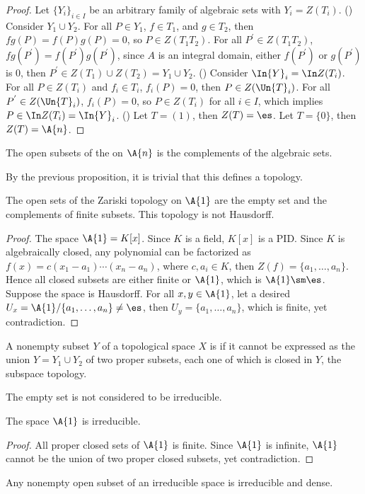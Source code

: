 \documentclass[10pt]{article}
\begin{document}
\begin{proof}
    Let ${\{{Y}_{i}\}}_{i\in I}$ be an arbitrary family of algebraic sets with ${Y}_{i}=Z({T}_{i})$. 
    () Consider ${Y}_{1}\cup{Y}_{2}$. For all $P\in{Y}_{1}$, $f\in{T}_{1}$, and $g\in{T}_{2}$, then $fg(P)=f(P)g(P)=0$, so $P\in Z({T}_{1}{T}_{2})$. For all ${P}^{'}\in Z({T}_{1}{T}_{2})$, $fg({P}^{'})=f({P}^{'})g({P}^{'})$, since $A$ is an integral domain, either $f({P}^{'})$ or $g({P}^{'})$ is 0, then ${P}^{'}\in Z({T}_{1})\cup Z({T}_{2})={Y}_{1}\cup{Y}_{2}$. () Consider $\In{Y}_{i}=\In Z({T}_{i})$. For all $P\in Z({T}_{i})$ and ${f}_{i}\in{T}_{i}$, ${f}_{i}(P)=0$, then $P\in Z(\Un{T}_{i})$. For all ${P}^{'}\in Z(\Un{T}_{i})$, ${f}_{i}(P)=0$, so $P\in Z({T}_{i})$ for all $i\in I$, which implies $P\in\In Z({T}_{i})=\In{Y}_{i}$. () Let $T=(1)$, then $Z(T)=\es$. Let $T=\{0\}$, then $Z(T)=\A{n}$.
\end{proof}
\begin{definition}
    The open subsets of the  on $\A{n}$ is the complements of the algebraic sets.
\end{definition}
\par
By the previous proposition, it is trivial that this defines a topology.
\begin{example}
    The open sets of the Zariski topology on $\A{1}$ are the empty set and the complements of finite subsets. This topology is not Hausdorff.
\end{example}
\begin{proof}
    The space $\A{1}=K[x]$. Since $K$ is a field, $K[x]$ is a PID. Since $K$ is algebraically closed, any polynomial can be factorized as $f(x)=c({x}_{1}-{a}_{1})\cdots({x}_{n}-{a}_{n})$, where $c,{a}_{i}\in K$, then $Z(f)=\{{a}_{1},\dots,{a}_{n}\}$. Hence all closed subsets are either finite or $\A{1}$, which is $\A{1}\sm\es$. Suppose the space is Hausdorff. For all $x,y\in\A{1}$, let a desired ${U}_{x}=\A{1}/\{{a}_{1},\dots,{a}_{n}\}\ne\es$, then ${U}_{y}=\{{a}_{1},\dots,{a}_{n}\}$, which is finite, yet contradiction.
\end{proof}
\begin{definition}
    A nonempty subset $Y$ of a topological space $X$ is  if it cannot be expressed as the union $Y={Y}_{1}\cup{Y}_{2}$ of two proper subsets, each one of which is closed in $Y$, the subspace topology.
\end{definition}
\begin{remark}
    The empty set is not considered to be irreducible.
\end{remark}
\begin{example}
    The space $\A{1}$ is irreducible.
\end{example}
\begin{proof}
    All proper closed sets of $\A{1}$ is finite. Since $\A{1}$ is infinite, $\A{1}$ cannot be the union of two proper closed subsets, yet contradiction.
\end{proof}
\begin{example}
    Any nonempty open subset of an irreducible space is irreducible and dense.
\end{example}
\end{document}
